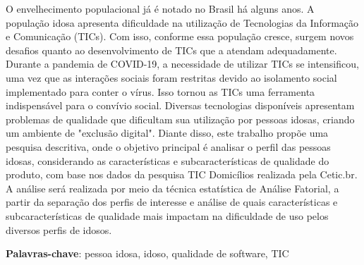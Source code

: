 \begin{resumo}
O envelhecimento populacional já é notado no Brasil há alguns anos. A população idosa apresenta dificuldade na utilização de Tecnologias da Informação e Comunicação (TICs). Com isso, conforme essa população cresce, surgem novos desafios quanto ao desenvolvimento de TICs que a atendam adequadamente. Durante a pandemia de COVID-19, a necessidade de utilizar TICs se intensificou, uma vez que as interações sociais foram restritas devido ao isolamento social implementado para conter o vírus. Isso tornou as TICs uma ferramenta indispensável para o convívio social. Diversas tecnologias disponíveis apresentam problemas de qualidade que dificultam sua utilização por pessoas idosas, criando um ambiente de "exclusão digital". Diante disso, este trabalho propõe uma pesquisa descritiva, onde o objetivo principal é analisar o perfil das pessoas idosas, considerando as características e subcaracterísticas de qualidade do produto, com base nos dados da pesquisa TIC Domicílios realizada pela Cetic.br. A análise será realizada por meio da técnica estatística de Análise Fatorial, a partir da separação dos perfis de interesse e análise de quais características e subcaracterísticas de qualidade mais impactam na dificuldade de uso pelos diversos perfis de idosos.


 \vspace{\onelineskip}
    
 \noindent
 \textbf{Palavras-chave}: pessoa idosa, idoso, qualidade de software, TIC
\end{resumo}
